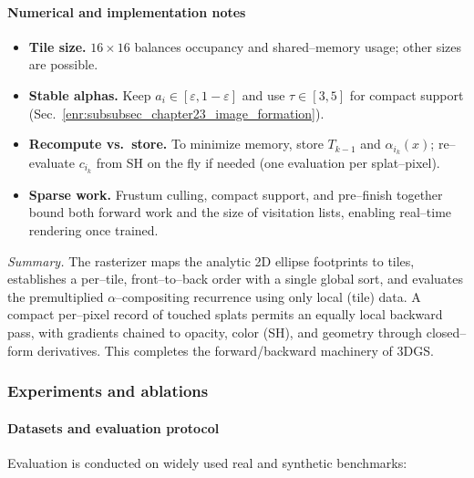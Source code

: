 \begin{enrichment}
\begin{enrichment}
\begin{enrichment}
        \paragraph{Numerical and implementation notes}
        \begin{itemize}
            \item \textbf{Tile size.} $16{\times}16$ balances occupancy and shared–memory usage; other sizes are possible.
            \item \textbf{Stable alphas.} Keep $a_i\in[\varepsilon,1-\varepsilon]$ and use $\tau\in[3,5]$ for compact support (Sec.~\ref{enr:subsubsec_chapter23_image_formation}).
            \item \textbf{Recompute vs.\ store.} To minimize memory, store $T_{k-1}$ and $\alpha_{i_k}(x)$; re–evaluate $c_{i_k}$ from SH on the fly if needed (one evaluation per splat–pixel).
            \item \textbf{Sparse work.} Frustum culling, compact support, and pre–finish together bound both forward work and the size of visitation lists, enabling real–time rendering once trained.
        \end{itemize}
        
        \medskip
        \noindent\emph{Summary.} The rasterizer maps the analytic 2D ellipse footprints to tiles, establishes a per–tile, front–to–back order with a single global sort, and evaluates the premultiplied $\alpha$–compositing recurrence using only local (tile) data. A compact per–pixel record of touched splats permits an equally local backward pass, with gradients chained to opacity, color (SH), and geometry through closed–form derivatives. This completes the forward/backward machinery of 3DGS.
        
        
        
        \subsubsection{Experiments and ablations}\label{enr:subsubsec_chapter23_3dgs_experiments}
        
        \paragraph{Datasets and evaluation protocol}
        Evaluation is conducted on widely used real and synthetic benchmarks:
        

\end{enrichment}
\end{enrichment}
\end{enrichment}
